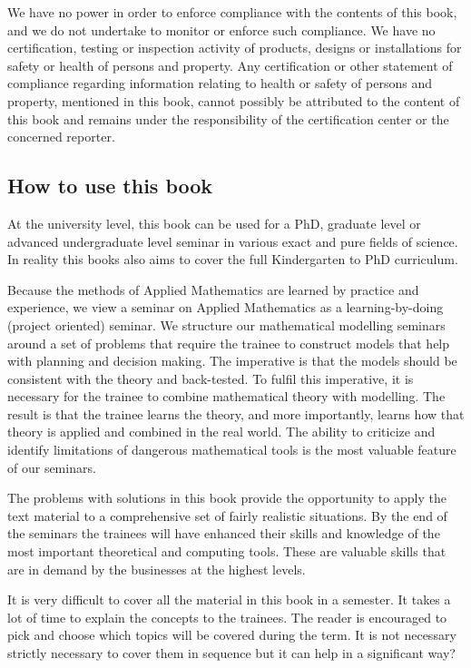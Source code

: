 	We have no power in order to enforce compliance with the contents of this book, and we do not undertake to monitor or enforce such compliance. We have no certification, testing or inspection activity of products, designs or installations for safety or health of persons and property. Any certification or other statement of compliance regarding information relating to health or safety of persons and property, mentioned in this book, cannot possibly be attributed to the content of this book and remains under the responsibility of the certification center or the concerned reporter.

	\pagebreak	
	\subsection{How to use this book}

	At the university level, this book can be used for a PhD, graduate level or advanced undergraduate level seminar in various exact and pure fields of science. In reality this books also aims to cover the full Kindergarten to PhD curriculum.

	Because the methods of Applied Mathematics are learned by practice and experience, we view a seminar on Applied Mathematics as a learning-by-doing (project oriented) seminar. We structure our mathematical modelling seminars around a set of problems that require the trainee to construct models that help with planning and decision making. The imperative is that the models should be consistent with the theory and back-tested. To fulfil this imperative, it is necessary for the trainee to combine mathematical theory with modelling. The result is that the trainee learns the theory, and more importantly, learns how that theory is applied and combined in the real world. The ability to criticize and identify limitations of dangerous mathematical tools is the most valuable feature of our seminars.

	The problems with solutions in this book provide the opportunity to apply the text material to a comprehensive set of fairly realistic situations. By the end of the seminars the trainees will have enhanced their skills and knowledge of the most important theoretical and computing tools. These are valuable skills that are in demand by the businesses at the highest levels.

	It is very difficult to cover all the material in this book in a semester. It takes a lot of time to explain the concepts to the trainees. The reader is encouraged to pick and choose which topics will be covered during the term. It is not necessary strictly necessary to cover them in sequence but it can help in a significant way?

